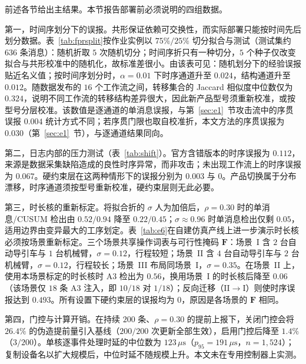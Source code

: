 \documentclass[manuscript,screen,review]{acmart}
\begin{document}
前述各节给出主结果。本节报告部署前必须说明的四组数据。

第一，时间序划分下的误报。共形保证依赖可交换性，而实际部署只能按时间先后划分数据。表~\ref{tab:fprsplit}按作业实例以 $75\%/25\%$ 切分拟合与测试（测试集约 $636$ 条消息）：随机折取 $5$ 次随机切分；时间序折只有一种切分，$5$ 个种子仅改变拟合与共形校准中的随机化，故标准差很小。由该表可见：随机划分下的经验误报贴近名义值；按时间序划分时，$\alpha=0.01$ 下时序通道升至 $0.024$，结构通道升至 $0.012$。随数据发布的 $16$ 个工作流之间，转移集合的 {Jaccard} 相似度中位数仅为 $0.324$，说明不同工作流的转移结构差异很大，因此新产品型号须重新校准，或按型号分层校准。该数值是逐通道的单消息误报，与第~\ref{sec:e1}~节攻击流中的序贯误报 $0.004$ 统计方式不同；若序贯门限也取自校准折，本文方法的序贯误报为 $0.030$（第~\ref{sec:e1}~节），与逐通道结果同向。

第二，日志内部的压力测试（表~\ref{tab:shift}）。官方含错版本的时序误报为 $0.112$，来源是数据采集缺陷造成的良性时序异常，而非攻击；未出现工作流上的时序误报为 $0.067$。硬约束层在这两种情形下的误报分别为 $0.003$ 与 $0$。产品切换属于分布漂移，时序通道须按型号重新校准，硬约束层则无此必要。

第三，时长核的重新标定。将拟合折的 $\sigma$ 人为加倍后，$\rho=0.30$ 时的单消息/{CUSUM} 检出由 $0.52/0.94$ 降至 $0.22/0.45$；$\sigma\approx0.96$ 时单消息检出仅剩 $0.05$，适用边界由变异最大的工序划定。表~\ref{tab:e6}在自建仿真产线上进一步演示时长核必须按场景重新标定。三个场景共享操作词表与可行性掩码 $\mathbf F$：场景~I 含 $2$ 台自动导引车与 $1$ 台机械臂，$\sigma=0.12$，行程较短；场景~II 含 $4$ 台自动导引车与 $2$ 台机械臂，$\sigma=0.12$，行程较长；场景~III 布局同场景~I，$\sigma=0.35$。在场景~II 上，使用本场景标定的时长核时 {A3} 检出为 $0.56$，换用场景~I 的时长核后降至 $0.06$（该场景仅 $18$ 条 {A3} 注入，即 $10/18$ 对 $1/18$）；反向迁移（II$\to$I）则使时序误报达到 $0.493$。所有设置下硬约束层的误报均为 $0$，原因是各场景的 $\mathbf F$ 相同。

第四，门控与计算开销。在持续 $200$ 条、$\rho=0.30$ 的提前上报下，关闭门控会将 $26.4\%$ 的伪造提前量引入基线（$200/200$ 次更新全部生效），启用门控后降至 $1.4\%$（$3/200$）。单核逐事件处理时延的中位数为 $123\,\mu\mathrm{s}$（$p_{95}=191\,\mu\mathrm{s}$，$n=1{,}524$）；复制设备名以扩大规模后，中位时延不随规模上升。本文未在专用控制器上实测。
\end{document}
